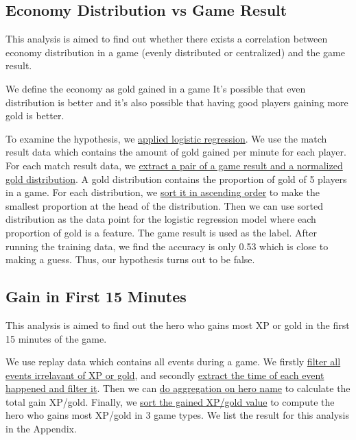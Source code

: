 \documentclass{article}
\begin{document}
\subsection{Economy Distribution vs Game Result}

This analysis is aimed to find out whether there exists a correlation between economy distribution in a game (evenly distributed or centralized) and the game result.

We define the economy as gold gained in a game
It's possible that even distribution is better and it's also possible that having good players gaining more gold is better.

To examine the hypothesis, we \href{https://github.com/Vopaaz/big-data-psg-lgd/blob/master/src/main/scala/EcoDistributionTrain.scala#L48-L50}{applied logistic regression}.
We use the match result data which contains the amount of gold gained per minute for each player.
For each match result data, we \href{https://github.com/Vopaaz/big-data-psg-lgd/blob/master/src/main/scala/EcoDistributionTrain.scala#L36-L42}{extract a pair of a game result and a normalized gold distribution}.
A gold distribution contains the proportion of gold of 5 players in a game. For each distribution, we \href{https://github.com/Vopaaz/big-data-psg-lgd/blob/master/src/main/scala/EcoDistributionTrain.scala#L43-L44}{sort it in ascending order} to make the smallest proportion at the head of the distribution.
Then we can use sorted distribution as the data point for the logistic regression model where each proportion of gold is a feature. The game result is used as the label.
After running the training data, we find the accuracy is only 0.53 which is close to making a guess. Thus, our hypothesis turns out to be false.

\subsection{Gain in First 15 Minutes}

This analysis is aimed to find out the hero who gains most XP or gold in the first 15 minutes of the game.

We use replay data which contains all events during a game. We firstly \href{https://github.com/Vopaaz/big-data-psg-lgd/blob/master/src/main/scala/First15minGain.scala#L44-L47}{filter all events irrelavant of XP or gold}, and secondly \href{https://github.com/Vopaaz/big-data-psg-lgd/blob/master/src/main/scala/First15minGain.scala#L48-L50}{extract the time of each event happened and filter it}.
Then we can \href{https://github.com/Vopaaz/big-data-psg-lgd/blob/master/src/main/scala/First15minGain.scala#L81-L82}{do aggregation on hero name} to calculate the total gain XP/gold. Finally, we \href{https://github.com/Vopaaz/big-data-psg-lgd/blob/master/src/main/scala/First15minGain.scala#L89-L96}{sort the gained XP/gold value} to compute the hero who gains most XP/gold in 3 game types. We list the result for this analysis in the Appendix.
\end{document}
